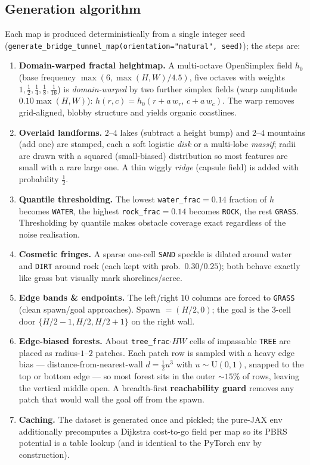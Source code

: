 \documentclass[11pt]{article}
\newcommand{\code}[1]{\texttt{#1}}
\begin{document}
\subsection{Generation algorithm}\label{sec:gen}
Each map is produced deterministically from a single integer seed
(\code{generate\_bridge\_tunnel\_map(orientation="natural", seed)}); the steps are:
\begin{enumerate}[leftmargin=1.4em, itemsep=2pt]
\item \textbf{Domain-warped fractal heightmap.} A multi-octave OpenSimplex field
$h_0$ (base frequency $\max(6,\max(H,W)/4.5)$, five octaves with weights
$1,\tfrac12,\tfrac14,\tfrac18,\tfrac1{16}$) is \emph{domain-warped} by two further
simplex fields (warp amplitude $0.10\max(H,W)$): $h(r,c)=h_0(r+a\,w_r,\,c+a\,w_c)$.
The warp removes grid-aligned, blobby structure and yields organic coastlines.
\item \textbf{Overlaid landforms.} $2$--$4$ lakes (subtract a height bump) and
$2$--$4$ mountains (add one) are stamped, each a soft logistic \emph{disk} or a
multi-lobe \emph{massif}; radii are drawn with a squared (small-biased)
distribution so most features are small with a rare large one. A thin wiggly
\emph{ridge} (capsule field) is added with probability $\tfrac12$.
\item \textbf{Quantile thresholding.} The lowest \code{water\_frac}$=0.14$ fraction
of $h$ becomes \code{WATER}, the highest \code{rock\_frac}$=0.14$ becomes
\code{ROCK}, the rest \code{GRASS}. Thresholding by quantile makes obstacle
coverage exact regardless of the noise realisation.
\item \textbf{Cosmetic fringes.} A sparse one-cell \code{SAND} speckle is dilated
around water and \code{DIRT} around rock (each kept with prob.\ $0.30$/$0.25$);
both behave exactly like grass but visually mark shorelines/scree.
\item \textbf{Edge bands \& endpoints.} The left/right $10$ columns are forced to
\code{GRASS} (clean spawn/goal approaches). Spawn $=(H/2,0)$; the goal is the
$3$-cell door $\{H/2{-}1,H/2,H/2{+}1\}$ on the right wall.
\item \textbf{Edge-biased forests.} About \code{tree\_frac}$\cdot HW$ cells of
impassable \code{TREE} are placed as radius-$1$--$2$ patches. Each patch row is
sampled with a heavy edge bias --- distance-from-nearest-wall $d=\tfrac12 u^3$ with
$u\!\sim\!\mathrm{U}(0,1)$, snapped to the top or bottom edge --- so most forest
sits in the outer ${\sim}15\%$ of rows, leaving the vertical middle open. A
breadth-first \textbf{reachability guard} removes any patch that would wall the
goal off from the spawn.
\item \textbf{Caching.} The dataset is generated once and pickled; the pure-JAX
env additionally precomputes a Dijkstra cost-to-go field per map so its PBRS
potential is a table lookup (and is identical to the PyTorch env by construction).
\end{enumerate}
\end{document}

